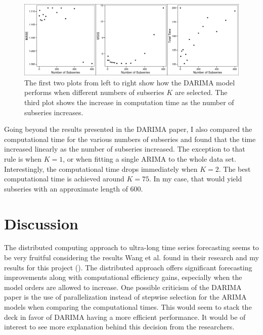 \documentclass[
]{article}
\begin{document}
\begin{figure}[ht]
  \begin{center}
    \includegraphics{Plots/darima_metrics_by_n_par.png}
    \caption{The first two plots from left to right show how the DARIMA model performs when different numbers of subseries $K$ are selected. The third plot shows the increase in computation time as the number of subseries increases.}
    \label{fig_darima_frct_mets}
  \end{center}
\end{figure}

Going beyond the results presented in the DARIMA paper, I also compared the computational time for the various numbers of subseries and found that the time increased linearly as the number of subseries increased. The exception to that rule is when $K = 1$, or when fitting a single ARIMA to the whole data set. Interestingly, the computational time drops immediately when $K = 2$. The best computational time is achieved around $K = 75$. In my case, that would yield subseries with an approximate length of 600. 

\section*{Discussion}

The distributed computing approach to ultra-long time series forecasting seems to be very fruitful considering the results Wang et al. found in their research and my results for this project (\cite*{wang_distributed_2020}). The distributed approach offers significant forecasting improvements along with computational efficiency gains, especially when the model orders are allowed to increase. One possible criticism of the DARIMA paper is the use of parallelization instead of stepwise selection for the ARIMA models when comparing the computational times. This would seem to stack the deck in favor of DARIMA having a more efficient performance. It would be of interest to see more explanation behind this decision from the researchers.
\end{document}
